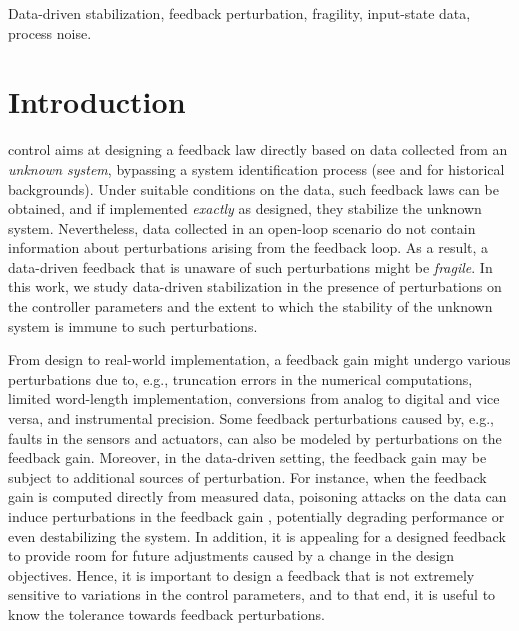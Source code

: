 \documentclass[9pt,shortpaper,twoside,web]{ieeecolor}
\begin{document}
\begin{IEEEkeywords}
Data-driven stabilization, feedback perturbation, fragility, input-state data, process noise. 
\end{IEEEkeywords}

\section{Introduction}
\label{sec:int}

 control aims at designing a feedback law directly based on data collected from an \emph{unknown system}, bypassing a system identification process \cite{de2019formulas,van2020data,HenkSlemma} (see \cite{hou2013model,van2023informativity,berberich2025overview} and \cite[Ch.~1.2]{DBLSCT2025} for historical backgrounds). Under suitable conditions on the data, such feedback laws can be obtained, and if implemented \emph{exactly} as designed, they stabilize the unknown system. Nevertheless, data collected in an open-loop scenario do not contain information about perturbations arising from the feedback loop. As a result, a data-driven feedback that is unaware of such perturbations might be \emph{fragile}.  In this work, we study data-driven stabilization in the presence of perturbations on the controller parameters and the extent to which the stability of the unknown system is immune to such perturbations. 

From design to real-world implementation, a feedback gain might undergo various perturbations due to, e.g., truncation errors in the numerical computations, limited word-length implementation, conversions from analog to digital and vice versa, and instrumental precision. Some feedback perturbations caused by, e.g., faults in the sensors and actuators, can also be modeled by perturbations on the feedback gain. Moreover, in the data-driven setting, the feedback gain may be subject to additional sources of perturbation. For instance, when the feedback gain is computed directly from measured data, poisoning attacks on the data can induce perturbations in the feedback gain \cite{russo2021poisoning,yu2023poisoning,fotiadis2024poisoning}, potentially degrading performance or even destabilizing the system. In addition, it is appealing for a designed feedback to provide room for future adjustments caused by a change in the design objectives. Hence, it is important to design a feedback that is not extremely sensitive to variations in the control parameters, and to that end, it is useful to know the tolerance towards feedback perturbations. 
\end{document}
